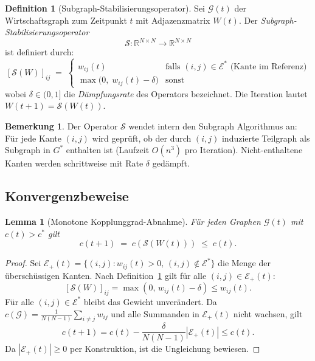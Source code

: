 \documentclass[a4paper, 12pt, twoside, openright]{report}
\newtheorem{lemma}[theorem]{Lemma}
\theoremstyle{definition}
\newtheorem{definition}[theorem]{Definition}
\theoremstyle{definition}
\newtheorem{bemerkung}{Bemerkung}[chapter]
\begin{document}
\begin{definition}[Subgraph-Stabilisierungsoperator]
\label{def:stabop}
    Sei $\mathcal{G}(t)$ der Wirtschaftsgraph zum Zeitpunkt $t$ mit Adjazenzmatrix $W(t)$.
    Der \emph{Subgraph-Stabilisierungsoperator}
    \[
        \mathcal{S} : \mathbb{R}^{N \times N} \to \mathbb{R}^{N \times N}
    \]
    ist definiert durch:
    \[
        [\mathcal{S}(W)]_{ij} \;=\;
        \begin{cases}
            w_{ij}(t) & \text{falls } (i,j) \in \mathcal{E}^* \text{ (Kante im Referenz)} \\
            \max\!\bigl(0,\; w_{ij}(t) - \delta\bigr) & \text{sonst}
        \end{cases}
    \]
    wobei $\delta \in (0,1]$ die \emph{Dämpfungsrate} des Operators bezeichnet.
    Die Iteration lautet $W(t+1) = \mathcal{S}(W(t))$.
\end{definition}

\begin{bemerkung}
    Der Operator $\mathcal{S}$ wendet intern den Subgraph Algorithmus an: Für jede
    Kante $(i,j)$ wird geprüft, ob der durch $(i,j)$ induzierte Teilgraph
    als Subgraph in $G^*$ enthalten ist (Laufzeit $O(n^3)$ pro Iteration).
    Nicht-enthaltene Kanten werden schrittweise mit Rate $\delta$ gedämpft.
\end{bemerkung}

\subsection{Konvergenzbeweise}

\begin{lemma}[Monotone Kopplung\-grad-Abnahme]
\label{lem:mono_c}
    Für jeden Graphen $\mathcal{G}(t)$ mit $c(t) > c^*$ gilt
    \[
        c(t+1) \;=\; c(\mathcal{S}(W(t))) \;\leq\; c(t).
    \]
\end{lemma}

\begin{proof}
    Sei $\mathcal{E}_+(t) = \{(i,j) : w_{ij}(t) > 0,\, (i,j) \notin \mathcal{E}^*\}$
    die Menge der überschüssigen Kanten. Nach Definition~\ref{def:stabop} gilt für
    alle $(i,j) \in \mathcal{E}_+(t)$:
    \[
        [\mathcal{S}(W)]_{ij} = \max(0,\, w_{ij}(t) - \delta) \leq w_{ij}(t).
    \]
    Für alle $(i,j) \in \mathcal{E}^*$ bleibt das Gewicht unverändert. Da
    $c(\mathcal{G}) = \frac{1}{N(N-1)}\sum_{i \neq j} w_{ij}$ und alle
    Summanden in $\mathcal{E}_+(t)$ nicht wachsen, gilt
    \[
        c(t+1) = c(t) - \frac{\delta}{N(N-1)} |\mathcal{E}_+(t)| \leq c(t).
    \]
    Da $|\mathcal{E}_+(t)| \geq 0$ per Konstruktion, ist die Ungleichung bewiesen.
\end{proof}
\end{document}
